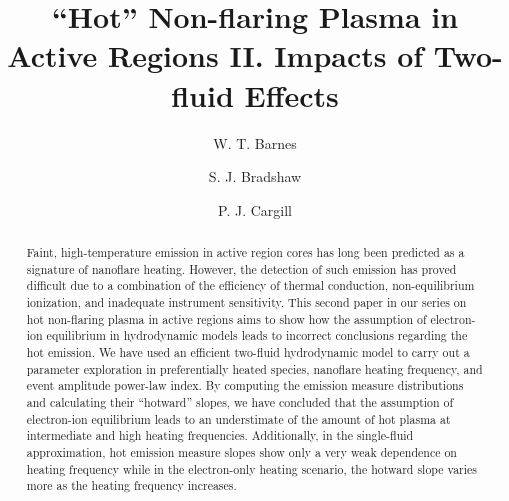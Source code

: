 \documentclass[iop]{emulateapj}
\begin{document}
	\title{``Hot'' Non-flaring Plasma in Active Regions II. Impacts of Two-fluid Effects}
	\author{W. T. Barnes}
	\author{S. J. Bradshaw}
	\author{P. J. Cargill}
	
	\begin{abstract}
		Faint, high-temperature emission in active region cores has long been predicted as a signature of nanoflare heating. However, the detection of such emission has proved difficult due to a combination of the efficiency of thermal conduction, non-equilibrium ionization, and inadequate instrument sensitivity. This second paper in our series on hot non-flaring plasma in active regions aims to show how the assumption of electron-ion equilibrium in hydrodynamic models leads to incorrect conclusions regarding the hot emission. We have used an efficient two-fluid hydrodynamic model to carry out a parameter exploration in preferentially heated species, nanoflare heating frequency, and event amplitude power-law index. By computing the emission measure distributions and calculating their ``hotward'' slopes, we have concluded that the assumption of electron-ion equilibrium leads to an understimate of the amount of hot plasma at intermediate and high heating frequencies. Additionally, in the single-fluid approximation, hot emission measure slopes show only a very weak dependence on heating frequency while in the electron-only heating scenario, the hotward slope varies more as the heating frequency increases. 
	\end{abstract}
	
\end{document}
